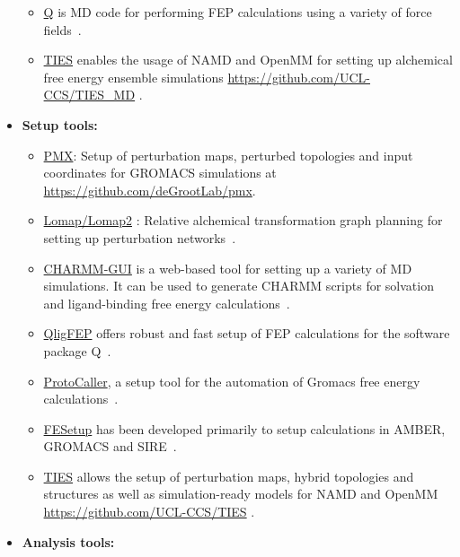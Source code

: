 \documentclass[9pt,bestpractices]{livecoms}
\begin{document}
\begin{itemize}
\begin{itemize}
	\item \href{https://github.com/qusers/Q6}{Q} is MD code for performing FEP calculations using a variety of force fields~\cite{aaquist2017q6}. 
    \item \href{http://www.ties-service.org}{TIES} enables the usage of NAMD and OpenMM for setting up alchemical free energy ensemble simulations \url{https://github.com/UCL-CCS/TIES_MD} \cite{bieniek2023}.
	\end{itemize}
\item[] \textbf{Setup tools:}
	\begin{itemize}
	\item \href{http://pmx.mpibpc.mpg.de/instructions.html}{PMX}: Setup of perturbation maps, perturbed topologies and input coordinates for GROMACS simulations at \url{https://github.com/deGrootLab/pmx}.
	\item \href{https://github.com/MobleyLab/Lomap}{Lomap/Lomap2} : Relative alchemical transformation graph planning for setting up perturbation networks~\cite{liu2013lead}.
	\item \href{http://www.charmm-gui.org/}{CHARMM-GUI} is a web-based tool for setting up a variety of MD simulations. It can be used to generate CHARMM scripts for solvation and ligand-binding free energy calculations~\cite{jo2008charmmgui}.
	\item \href{https://github.com/qusers/qligfep}{QligFEP} offers robust and fast setup of FEP calculations for the software package Q~\cite{jespers2019qligfep}.
	\item \href{https://github.com/protocaller/ProtoCaller}{ProtoCaller}, a setup tool for the automation of Gromacs free energy calculations~\cite{suruzhon2020protocaller}.
	\item \href{https://fesetup.readthedocs.io/en/latest/introduction.html}{FESetup} has been developed primarily to setup calculations in AMBER, GROMACS and SIRE~\cite{loeffler2015fesetup}.
    \item \href{http://www.ties-service.org}{TIES} allows the setup of perturbation maps, hybrid topologies and structures as well as simulation-ready models for NAMD and OpenMM \url{https://github.com/UCL-CCS/TIES} \cite{bieniek2023}.
	\end{itemize}
\item []\textbf{Analysis tools:}
	\begin{itemize}


\end{itemize}
\end{itemize}
\end{document}
